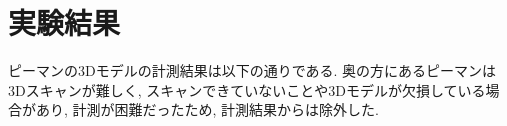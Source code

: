 \section{実験結果}
ピーマンの3Dモデルの計測結果は以下の通りである.
奥の方にあるピーマンは3Dスキャンが難しく, スキャンできていないことや3Dモデルが欠損している場合があり, 計測が困難だったため, 計測結果からは除外した.
